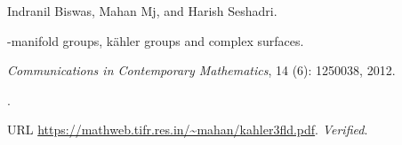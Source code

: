 Indranil Biswas, Mahan Mj, and Harish Seshadri.

-manifold groups, k\"ahler groups and complex surfaces.

\newblock \emph{Communications in Contemporary Mathematics}, 14
  (6): 1250038, 2012.

\newblock {}.

\newblock URL \url{https://mathweb.tifr.res.in/~mahan/kahler3fld.pdf}.
\newblock \emph{Verified}.

